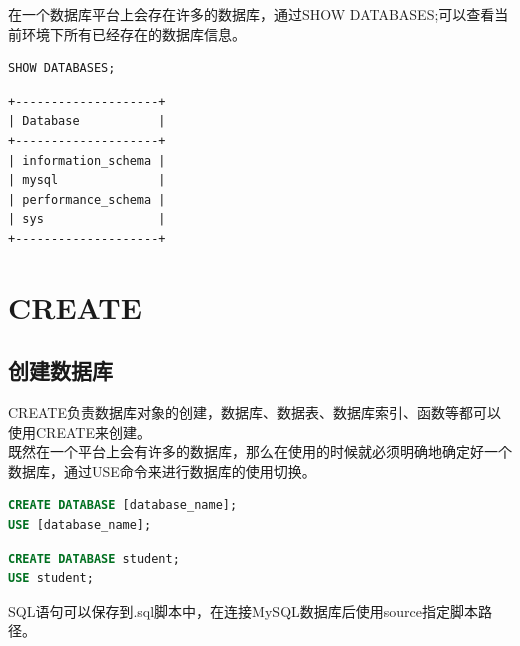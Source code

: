\documentclass[12pt, openany, oneside]{book}
\begin{document}
在一个数据库平台上会存在许多的数据库，通过SHOW DATABASES;可以查看当前环境下所有已经存在的数据库信息。 \\


\begin{lstlisting}[language=SQL]
SHOW DATABASES;
\end{lstlisting}

\begin{tcolorbox}
    \begin{verbatim}
+--------------------+
| Database           |
+--------------------+
| information_schema |
| mysql              |
| performance_schema |
| sys                |
+--------------------+
	\end{verbatim}
\end{tcolorbox}

\newpage

\chapter{CREATE}

\section{创建数据库}

CREATE负责数据库对象的创建，数据库、数据表、数据库索引、函数等都可以使用CREATE来创建。 \\

既然在一个平台上会有许多的数据库，那么在使用的时候就必须明确地确定好一个数据库，通过USE命令来进行数据库的使用切换。

\vspace{-0.5cm}

\begin{lstlisting}[language=SQL]
CREATE DATABASE [database_name];
USE [database_name];
\end{lstlisting}

\vspace{0.5cm}


\begin{lstlisting}[language=SQL]
CREATE DATABASE student;
USE student;
\end{lstlisting}

SQL语句可以保存到.sql脚本中，在连接MySQL数据库后使用source指定脚本路径。

\vspace{-0.5cm}
\end{document}
